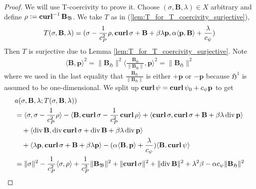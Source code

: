 \documentclass[../master_thesis.tex]{subfiles}
\begin{document}
\begin{proof}
    We will use T-coercivity to prove it. Choose $(\sigma, \mathbf{B},\lambda) \in X$ 
    arbitrary and define $\rho \vcentcolon= \veccurl^{-1} \mathbf{B}_{\mathfrak{B}}$.
    We take $T$ as in (\ref{lem:T_for_T_coercivity_surjective}),
    \begin{align*}
        T(\sigma, \mathbf{B},\lambda)
        = (\sigma - \frac{1}{c_P^2}\rho, \veccurl \sigma + \mathbf{B} + \beta \lambda\mathbf{p},
            \alpha \langle \mathbf{p},\mathbf{B} \rangle  + \frac{\lambda}{c_\psi} )
    \end{align*}
    Then $T$ is surjective due to Lemma \ref{lem:T_for_T_coercivity_surjective}. 
    Note 
    \begin{align*}
        \langle \mathbf{B}, \mathbf{p} \rangle ^ 2
        = \lVert \mathbf{B}_\mathfrak{H} \rVert^2  
            \langle \frac{\mathbf{B}_\mathfrak{H}}{\lVert \mathbf{B}_\mathfrak{H} \rVert}, \mathbf{p} \rangle ^ 2
        = \lVert \mathbf{B}_\mathfrak{H} \rVert^2
    \end{align*}
    where we used in the last equality that $\frac{\mathbf{B}_\mathfrak{H}}{\lVert \mathbf{B}_\mathfrak{H} \rVert}$
    is either $+\mathbf{p}$ or $-\mathbf{p}$ because $\mathfrak{H}^1$ is assumed to be one-dimensional.
    We split up $\veccurl\psi = \veccurl\psi_0 + c_\psi \mathbf{p}$ to get 
    \begin{align*}
        &a(\sigma, \mathbf{B},\lambda;T(\sigma, \mathbf{B},\lambda))
        \\ &=\langle \sigma, \sigma - \frac{1}{c_P^2} \rho \rangle 
            - \langle \mathbf{B}, \veccurl \sigma - \frac{1}{c_P^2}\veccurl \rho \rangle
            + \langle \veccurl \sigma , \veccurl \sigma + \mathbf{B} + \beta \lambda \diver \mathbf{p} \rangle
        \\ &\quad + \langle \diver \mathbf{B}, \diver \veccurl \sigma 
            + \diver \mathbf{B} + \beta \lambda \diver \mathbf{p}\rangle
        \\ &\quad + \langle \lambda \mathbf{p}, \veccurl \sigma + \mathbf{B} + \beta \lambda \mathbf{p}\rangle
            - (\alpha \langle \mathbf{B}, \mathbf{p} \rangle + \frac{\lambda}{c_\psi})
            \langle \mathbf{B} , \veccurl\psi \rangle
        \\ &= \lVert \sigma \rVert^2 - \frac{1}{c_P^2} \langle \sigma , \rho \rangle 
            + \frac{1}{c_P^2} \lVert \mathbf{B}_\mathfrak{B} \rVert^2 + \lVert  \veccurl \sigma \rVert^2
            + \lVert \diver \mathbf{B} \rVert ^2 + \lambda ^2 \beta - \alpha c_\psi \lVert \mathbf{B}_\mathfrak{H} \rVert^2

\end{align*}
\end{proof}
\end{document}
